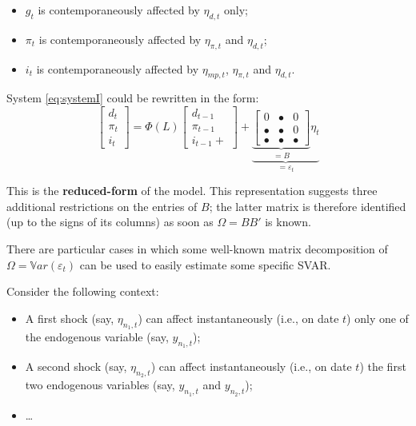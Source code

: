 \documentclass[
]{book}
\providecommand{\tightlist}{%
  \setlength{\itemsep}{0pt}\setlength{\parskip}{0pt}}
\theoremstyle{definition}
\theoremstyle{definition}
\theoremstyle{definition}
\theoremstyle{definition}
\theoremstyle{remark}
\begin{document}
\begin{itemize}
\tightlist
\item
  \(g_t\) is contemporaneously affected by \(\eta_{d,t}\) only;
\item
  \(\pi_t\) is contemporaneously affected by \(\eta_{\pi,t}\) and \(\eta_{d,t}\);
\item
  \(i_t\) is contemporaneously affected by \(\eta_{mp,t}\), \(\eta_{\pi,t}\) and \(\eta_{d,t}\).
\end{itemize}

System \eqref{eq:systemI} could be rewritten in the form:
\begin{equation}
\left[\begin{array}{c}
d_t\\
\pi_t\\
i_t
\end{array}\right]
= \Phi(L)
\left[\begin{array}{c}
d_{t-1}\\
\pi_{t-1}\\
i_{t-1} +
\end{array}\right] +\underbrace{\underbrace{
\left[
\begin{array}{ccc}
0 & \bullet & 0 \\
\bullet & \bullet & 0 \\
\bullet & \bullet & \bullet
\end{array}
\right]}_{=B} \eta_t}_{=\varepsilon_t}\label{eq:BBBB}
\end{equation}

This is the \textbf{reduced-form} of the model. This representation suggests three additional restrictions on the entries of \(B\); the latter matrix is therefore identified (up to the signs of its columns) as soon as \(\Omega = BB'\) is known.

There are particular cases in which some well-known matrix decomposition of \(\Omega=\mathbb{V}ar(\varepsilon_t)\) can be used to easily estimate some specific SVAR.

Consider the following context:

\begin{itemize}
\tightlist
\item
  A first shock (say, \(\eta_{n_1,t}\)) can affect instantaneously
  (i.e., on date \(t\)) only one of the endogenous variable (say, \(y_{n_1,t}\));
\item
  A second shock (say, \(\eta_{n_2,t}\)) can affect instantaneously
  (i.e., on date \(t\)) the first two endogenous variables (say, \(y_{n_1,t}\)
  and \(y_{n_2,t}\));
\item
  \ldots{}
\end{itemize}
\end{document}
